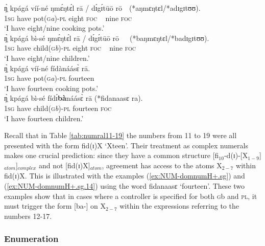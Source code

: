 \begin{exe}
\begin{exe}
\begin{exe}
\begin{exe}
\begin{exe}
\begin{exe}
\begin{exe}
\begin{exe}
\begin{exe}
\begin{exe}
\ex\label{ex:NUM-ungramhum-}
\gll   ŋ̩̀  kpágá víí-né   ŋmɛ́ŋtɛ́l rā /  dɪ́gɪ́tūō rō~~(*aŋmɛŋtɛl/*adɪgɪtʊʊ).\hspace*{-2cm}\\
  \textsc{1sg}  {have}  pot(\textsc{g}\textit{a})-\textsc{pl}  
 eight  \textsc{foc} ~ nine  \textsc{foc}\\
\glt `I have eight/nine cooking pots.'\\

\ex\label{ex:NUM-ungramhum+}
\gll    ŋ̩̀  kpágá bì-sé   ŋmɛ́ŋtɛ́l rā / dɪ́gɪ́tūō rō~~~(*baŋmɛŋtɛl/*badɪgɪtʊʊ).\hspace*{-2cm}\\
  \textsc{1sg}  {have}  {child(\textsc{g}\textit{b})-\textsc{pl}}  eight  \textsc{foc} ~ nine  \textsc{foc}\\
\glt `I have eight/nine children.'\\

\ex\label{ex:NUM-domnumH+.sg}
\gll  ŋ̩̀  kpágá víí-né   fídànáásɛ̀ rā.\\
  \textsc{1sg}  {have}  {pot(\textsc{g}\textit{a})-\textsc{pl}}  
{fourteen}\\
\glt `I have fourteen cooking pots.'\\


\ex\label{ex:NUM-domnumH+.sg.14}
\gll  ŋ̩̀  kpágá bì-sé    fídɪ́{\sls\bf bà}náásɛ̀ rā  (*fidanaasɛ ra).\\
    \textsc{1sg}  {have}  {child(\textsc{g}\textit{b})-\textsc{pl}}  
{fourteen}  \textsc{foc}  {}\\
\glt `I have fourteen children.'\\
\z
\z

Recall that in Table \ref{tab:numral11-19} the numbers from 11 to 19 were all
presented with the form
{\sls  fid(ɪ)X} `Xteen'. Their treatment as complex numerals makes one 
crucial
prediction: since they   have a common structure
[fi$_{10}$-d(ɪ)-[X$_{1-9}$]$_{atom}$]$_{complex}$ and not [fid(ɪ)X]$_{atom}$,
 agreement   has
access to the atoms X$_{2-7}$ within {\sls fid(ɪ)X}. This is
illustrated with the examples (\ref{ex:NUM-domnumH+.sg}) and
(\ref{ex:NUM-domnumH+.sg.14}) using the word {\sls fidanaasɛ}
`fourteen'.
These two examples show that in cases where a controller is specified for
both \textsc{g}{\sls b} and \textsc{pl}, it must trigger the form
[ba-] on X$_{2-7}$   within the expressions referring to the numbers 12-17.



\subsubsection{Enumeration}
\label{sec:NUM-enum}


\end{exe}
\end{exe}
\end{exe}
\end{exe}
\end{exe}
\end{exe}
\end{exe}
\end{exe}
\end{exe}
\end{exe}

